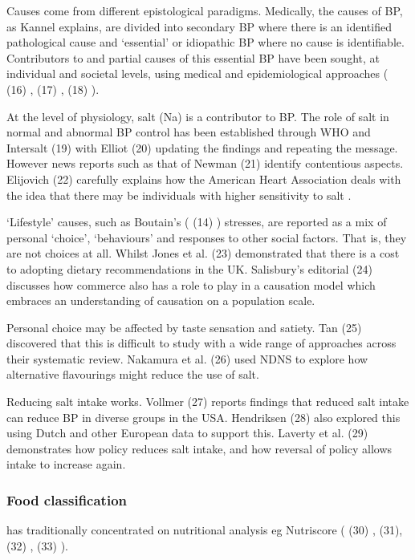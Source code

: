 \documentclass[
]{article}
\begin{document}
Causes come from different epistological paradigms. Medically, the
causes of BP, as Kannel explains, are divided into secondary BP where
there is an identified pathological cause and `essential' or idiopathic
BP where no cause is identifiable. Contributors to and partial causes of
this essential BP have been sought, at individual and societal levels,
using medical and epidemiological approaches ( (16) , (17) , (18) ).

At the level of physiology, salt (Na) is a contributor to BP. The role
of salt in normal and abnormal BP control has been established through
WHO and Intersalt (19) with Elliot (20) updating the findings and
repeating the message. However news reports such as that of Newman (21)
identify contentious aspects. Elijovich (22) carefully explains how the
American Heart Association deals with the idea that there may be
individuals with higher sensitivity to salt .

`Lifestyle' causes, such as Boutain's ( (14) ) stresses, are reported as
a mix of personal `choice', `behaviours' and responses to other social
factors. That is, they are not choices at all. Whilst Jones et al. (23)
demonstrated that there is a cost to adopting dietary recommendations in
the UK. Salisbury's editorial (24) discusses how commerce also has a
role to play in a causation model which embraces an understanding of
causation on a population scale.

Personal choice may be affected by taste sensation and satiety. Tan (25)
discovered that this is difficult to study with a wide range of
approaches across their systematic review. Nakamura et al. (26) used
NDNS to explore how alternative flavourings might reduce the use of
salt.

Reducing salt intake works. Vollmer (27) reports findings that reduced
salt intake can reduce BP in diverse groups in the USA. Hendriksen (28)
also explored this using Dutch and other European data to support this.
Laverty et al. (29) demonstrates how policy reduces salt intake, and how
reversal of policy allows intake to increase again.

\hypertarget{food-classification}{%
\subsubsection{Food classification}\label{food-classification}}

has traditionally concentrated on nutritional analysis eg Nutriscore (
(30) , (31), (32) , (33) ).
\end{document}
